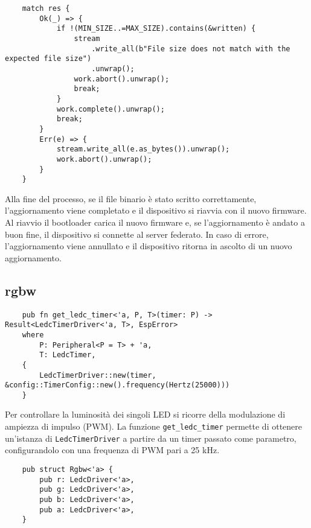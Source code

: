 \begin{listing}[H]
    \begin{verbatim}
    match res {
        Ok(_) => {
            if !(MIN_SIZE..=MAX_SIZE).contains(&written) {
                stream
                    .write_all(b"File size does not match with the expected file size")
                    .unwrap();
                work.abort().unwrap();
                break;
            }
            work.complete().unwrap();
            break;
        }
        Err(e) => {
            stream.write_all(e.as_bytes()).unwrap();
            work.abort().unwrap();
        }
    }
    \end{verbatim}
\end{listing}

Alla fine del processo, se il file binario è stato scritto correttamente, l'aggiornamento viene completato e il dispositivo si riavvia con il nuovo firmware.
Al riavvio il bootloader carica il nuovo firmware e, se l'aggiornamento è andato a buon fine, il dispositivo si connette al server federato.
In caso di errore, l'aggiornamento viene annullato e il dispositivo ritorna in ascolto di un nuovo aggiornamento.

\subsection{rgbw}

\begin{listing}[H]
    \begin{verbatim}
    pub fn get_ledc_timer<'a, P, T>(timer: P) -> Result<LedcTimerDriver<'a, T>, EspError>
    where
        P: Peripheral<P = T> + 'a,
        T: LedcTimer,
    {
        LedcTimerDriver::new(timer, &config::TimerConfig::new().frequency(Hertz(25000)))
    }
    \end{verbatim}
\end{listing}

Per controllare la luminosità dei singoli LED si ricorre della modulazione di ampiezza di impulso (PWM). 
La funzione \texttt{get\_ledc\_timer} permette di ottenere un'istanza di \texttt{LedcTimerDriver} a partire da un timer passato come parametro,
configurandolo con una frequenza di PWM pari a 25 kHz.

\begin{listing}[H]
    \begin{verbatim}
    pub struct Rgbw<'a> {
        pub r: LedcDriver<'a>,
        pub g: LedcDriver<'a>,
        pub b: LedcDriver<'a>,
        pub a: LedcDriver<'a>,
    }
    \end{verbatim}
\end{listing}

